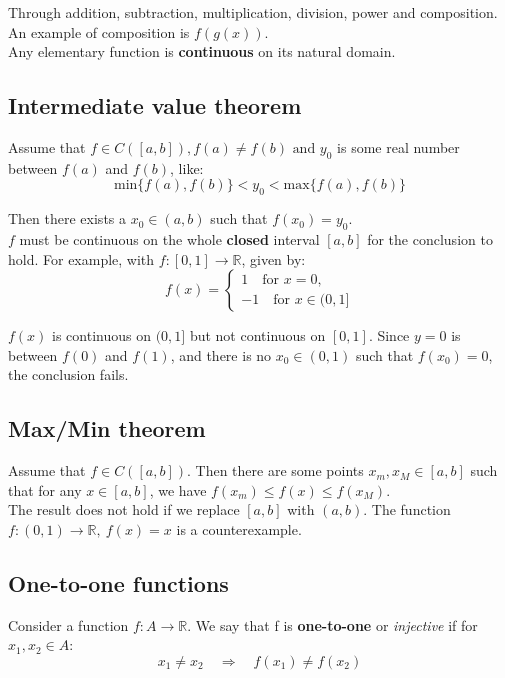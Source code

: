 \documentclass[11pt]{article}
\begin{document}
Through addition, subtraction, multiplication, division, power and composition. An example of composition is \(f(g(x))\).
\\[0pt]

Any elementary function is \textbf{continuous} on its natural domain.

\subsection{Intermediate value theorem}
\label{sec:org6ae72e3}
Assume that \(f \in C([a, b]), f(a) \neq f(b) \text{ and } y_0\) is some real number between \(f(a)\) and \(f(b)\), like:
\[\text{min}\{f(a), f(b)\} < y_0 < \text{max}\{f(a), f(b)\}\]

Then there exists a \(x_0 \in (a, b)\) such that \(f(x_0) = y_0\).
\\[0pt]

\(f\) must be continuous on the whole \textbf{closed} interval \([a, b]\) for the conclusion to hold. For example, with \(f : [0, 1] \rightarrow \mathbb{R}\), given by:
\[
f(x) = \begin{cases}
1 \quad \text{for } x = 0, \\
-1 \quad \text{for } x \in (0, 1]
\end{cases}
\]

\(f(x)\) is continuous on \((0, 1]\) but not continuous on \([0, 1]\). Since \(y = 0\) is between \(f(0)\) and \(f(1)\), and there is no \(x_0 \in (0, 1)\) such that \(f(x_0) = 0\), the conclusion fails.

\subsection{Max/Min theorem}
\label{sec:org2258a92}
Assume that \(f \in C([a, b])\). Then there are some points \(x_m, x_M \in [a, b]\) such that for any \(x \in [a, b]\), we have \(f(x_m) \le f(x) \le f(x_M)\).
\\[0pt]

The result does not hold if we replace \([a, b]\) with \((a, b)\). The function \(f : (0, 1) \rightarrow \mathbb{R}, \ f(x) = x\) is a counterexample.

\subsection{One-to-one functions}
\label{sec:org1031a99}
Consider a function \(f : A \rightarrow \mathbb{R}\). We say that f is \textbf{one-to-one} or \emph{injective} if for \(x_1, x_2 \in A\):
\[x_1 \neq x_2 \quad \Rightarrow \quad f(x_1) \neq f(x_2)\]
\end{document}
